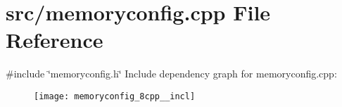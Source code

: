 \section{src/memoryconfig.cpp File Reference}
\label{memoryconfig_8cpp}
{\ttfamily \#include \char`\"{}memoryconfig.\+h\char`\"{}}\newline
Include dependency graph for memoryconfig.\+cpp\+:\nopagebreak
\begin{figure}[H]
\begin{center}
\leavevmode
\texttt{[image: memoryconfig\_8cpp\_\_incl]}
\end{center}
\end{figure}
